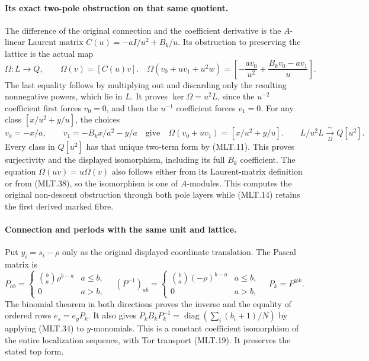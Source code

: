\paragraph{Its exact two-pole obstruction on that same quotient.}
The difference of the original
connection and the coefficient
derivative is the \(A\)-linear
Laurent matrix \(C(u)=-aI/u^2+B_k/u\).
Its obstruction to preserving the
lattice is the actual map
\[
 \Omega:L\longrightarrow Q,\qquad
 \Omega(v)=[C(u)v].
 \quad
 \Omega(v_0+uv_1+u^2w)
   =\left[-\frac{av_0}{u^2}
            +\frac{B_kv_0-av_1}{u}\right].               \tag{MLT.38}
\]
The last equality follows by multiplying
out and discarding only the resulting
nonnegative powers, which lie in \(L\).
It proves \(\ker\Omega=u^2L\), since
the \(u^{-2}\) coefficient first forces
\(v_0=0\), and then the \(u^{-1}\)
coefficient forces \(v_1=0\).
For any class \([x/u^2+y/u]\),
the choices
\[
 v_0=-x/a,\qquad v_1=-B_kx/a^2-y/a
 \quad\text{give}\quad
 \Omega(v_0+uv_1)=[x/u^2+y/u].
 \qquad L/u^2L\xrightarrow[\Omega]{\ \sim\ }Q[u^2].
                                                               \tag{MLT.39}
\]
Every class in \(Q[u^2]\) has that
unique two-term form by (MLT.11).
This proves surjectivity and the
displayed isomorphism, including
its full \(B_k\) coefficient.
The equation \(\Omega(uv)=u\Omega(v)\)
also follows either from its
Laurent-matrix definition or from
(MLT.38), so the isomorphism is
one of \(A\)-modules.
This computes the original
non-descent obstruction through
both pole layers while (MLT.14)
retains the first derived marked
fibre.

\paragraph{Connection and periods with the same unit and lattice.}
Put \(y_i=s_i-\rho\) only as the
original displayed coordinate
translation. The Pascal matrix is
\[
 P_{ab}=
 \begin{cases}\binom ba\rho^{b-a}&a\le b,\\0&a>b,\end{cases}
 \quad
 (P^{-1})_{ab}=
 \begin{cases}\binom ba(-\rho)^{b-a}&a\le b,\\0&a>b,\end{cases}
 \quad P_k=P^{\otimes k}.                                 \tag{MLT.40}
\]
The binomial theorem in both directions
proves the inverse and the equality
of ordered rows \(e_s=e_yP_k\).
It also gives
\(P_kB_kP_k^{-1}
=\operatorname{diag}(\sum_i(b_i+1)/N)\)
by applying (MLT.34) to \(y\)-monomials.
This is a constant coefficient
isomorphism of the entire localization
sequence, with Tor transport (MLT.19).
It preserves the stated top form.

